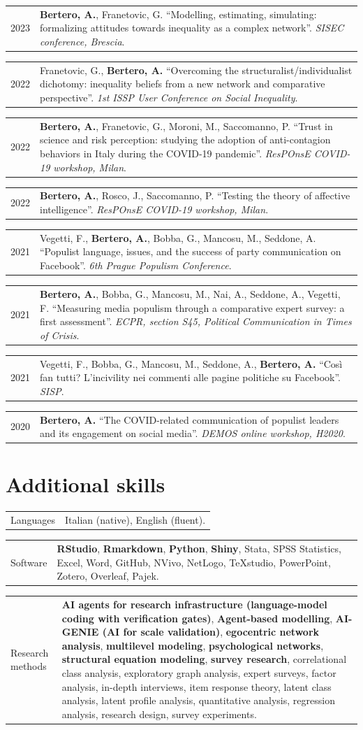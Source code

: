 \documentclass[10pt,a4paper]{article}
\makeatletter
\newlength{\yearw}\setlength{\yearw}{2.3cm}
\newlength{\bodyw}\setlength{\bodyw}{\dimexpr\textwidth-\yearw-0.45cm\relax}
\newcommand{\cv}[2]{%
  \needspace{2\baselineskip}%
  \par\noindent
  \begin{tabular}{@{}>{\raggedright\arraybackslash}p{\yearw}@{\hspace{0.45cm}}>{\raggedright\arraybackslash}p{\bodyw}@{}}
    \sanslabel\fontsize{8.5}{10.5}\selectfont\color{muted}#1 & #2
  \end{tabular}%
  \par\vspace{3pt}%
}
\newcommand{\venue}[1]{\textit{#1}}
\makeatother
\begin{document}
\cv{2023}{\textbf{Bertero, A.}, Franetovic, G. “Modelling, estimating, simulating: formalizing attitudes towards inequality as a complex network”. \venue{SISEC conference, Brescia}.}

\cv{2022}{Franetovic, G., \textbf{Bertero, A.} “Overcoming the structuralist/individualist dichotomy: inequality beliefs from a new network and comparative perspective”. \venue{1st ISSP User Conference on Social Inequality}.}

\cv{2022}{\textbf{Bertero, A.}, Franetovic, G., Moroni, M., Saccomanno, P. “Trust in science and risk perception: studying the adoption of anti-contagion behaviors in Italy during the COVID-19 pandemic”. \venue{ResPOnsE COVID-19 workshop, Milan}.}

\cv{2022}{\textbf{Bertero, A.}, Rosco, J., Saccomanno, P. “Testing the theory of affective intelligence”. \venue{ResPOnsE COVID-19 workshop, Milan}.}

\cv{2021}{Vegetti, F., \textbf{Bertero, A.}, Bobba, G., Mancosu, M., Seddone, A. “Populist language, issues, and the success of party communication on Facebook”. \venue{6th Prague Populism Conference}.}

\cv{2021}{\textbf{Bertero, A.}, Bobba, G., Mancosu, M., Nai, A., Seddone, A., Vegetti, F. “Measuring media populism through a comparative expert survey: a first assessment”. \venue{ECPR, section S45, Political Communication in Times of Crisis}.}

\cv{2021}{Vegetti, F., Bobba, G., Mancosu, M., Seddone, A., \textbf{Bertero, A.} “Così fan tutti? L’incivility nei commenti alle pagine politiche su Facebook”. \venue{SISP}.}

\cv{2020}{\textbf{Bertero, A.} “The COVID-related communication of populist leaders and its engagement on social media”. \venue{DEMOS online workshop, H2020}.}

\section{Additional skills}

\cv{Languages}{Italian (native), English (fluent).}

\cv{Software}{\textbf{RStudio}, \textbf{Rmarkdown}, \textbf{Python}, \textbf{Shiny}, Stata, SPSS Statistics, Excel, Word, GitHub, NVivo, NetLogo, TeXstudio, PowerPoint, Zotero, Overleaf, Pajek.}

\cv{Research methods}{\textbf{AI agents for research infrastructure (language-model coding with verification gates)}, \textbf{Agent-based modelling}, \textbf{AI-GENIE (AI for scale validation)}, \textbf{egocentric network analysis}, \textbf{multilevel modeling}, \textbf{psychological networks}, \textbf{structural equation modeling}, \textbf{survey research}, correlational class analysis, exploratory graph analysis, expert surveys, factor analysis, in-depth interviews, item response theory, latent class analysis, latent profile analysis, quantitative analysis, regression analysis, research design, survey experiments.}
\end{document}
